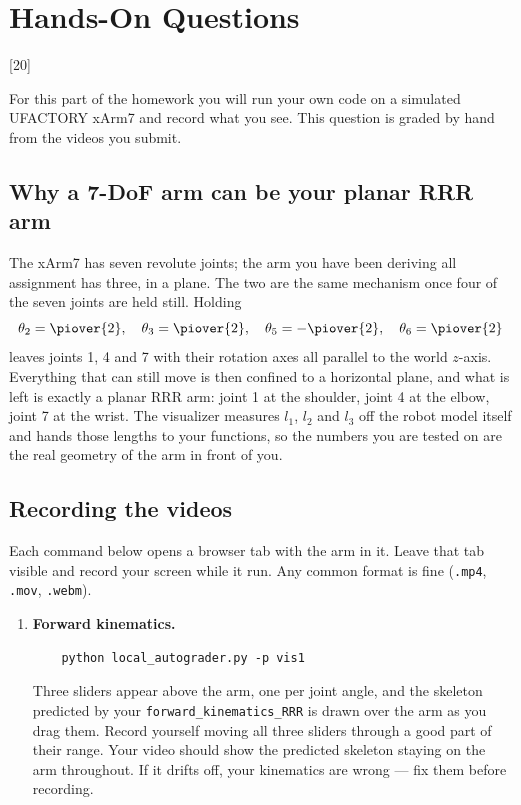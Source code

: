 \documentclass{16384_doc}
\begin{document}
\section{Hands-On Questions}

\begin{questions}

    [20]

For this part of the homework you will run your own code on a simulated
UFACTORY xArm7 and record what you see. This question is graded by hand from
the videos you submit.

\subsection*{Why a 7-DoF arm can be your planar RRR arm}

The xArm7 has seven revolute joints; the arm you have been deriving all
assignment has three, in a plane. The two are the same mechanism once four of
the seven joints are held still. Holding
\[
    \theta_2 = \piover{2}, \quad
    \theta_3 = \piover{2}, \quad
    \theta_5 = -\piover{2}, \quad
    \theta_6 = \piover{2}
\]
leaves joints 1, 4 and 7 with their rotation axes all parallel to the world
$z$-axis. Everything that can still move is then confined to a horizontal
plane, and what is left is exactly a planar RRR arm: joint 1 at the shoulder,
joint 4 at the elbow, joint 7 at the wrist. The visualizer measures $l_1$,
$l_2$ and $l_3$ off the robot model itself and hands those lengths to your
functions, so the numbers you are tested on are the real geometry of the arm in
front of you.

\subsection*{Recording the videos}

Each command below opens a browser tab with the arm in it. Leave that tab
visible and record your screen while it run. Any common format is fine (\verb!.mp4!, \verb!.mov!,
\verb!.webm!).

\begin{enumerate}
    \item \textbf{Forward kinematics.}

\begin{verbatim}
    python local_autograder.py -p vis1
\end{verbatim}

    Three sliders appear above the arm, one per joint angle, and the skeleton
    predicted by your \verb!forward_kinematics_RRR! is drawn over the arm as you
    drag them. Record yourself moving all three sliders through a good part of
    their range. Your video should show the predicted skeleton staying on the
    arm throughout. If it drifts off, your kinematics are wrong --- fix them
    before recording.


\end{enumerate}
\end{questions}
\end{document}
